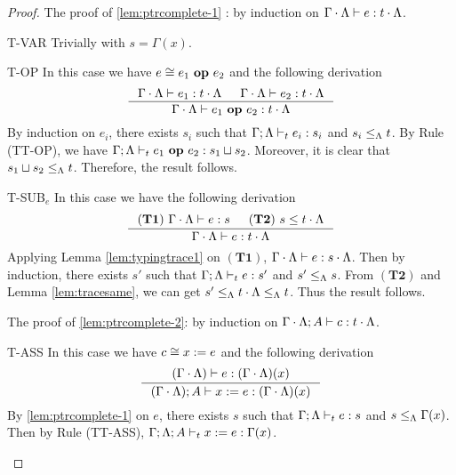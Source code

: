 {{{\begin{proof}
The proof of \ref{lem:ptrcomplete-1} : by induction on $\Gamma\cdot\Lambda \vdash e : t\cdot \Lambda $.
\begin{ProofEnumDesc}
\item[T-VAR] Trivially with $s = \Gamma(x)$.


\item[T-OP]  In this case we have $e \cong {e_1}~\textbf{op}~{e_2}$ and the following derivation
\begin{equation*}
\inference
{\Gamma\cdot\trace\vdash e_1 : t\cdot\trace & \Gamma\cdot\trace \vdash e_2 : t\cdot\trace}
{\Gamma\cdot\trace\vdash \leOP{e_1}{e_2} : t\cdot\trace}
\end{equation*}
By induction on $e_i$, there exists $s_i$ such that $\Gamma; \Lambda \vdash_{t} e_i : s_i$ and $s_i \leq_{\Lambda} t$.
By Rule {(TT-OP)}, we have $\Gamma; \Lambda\vdash_{t} {e_1}~\textbf{op}~{e_2} : s_1 \sqcup s_2$.
Moreover, it is clear that $s_1 \sqcup s_2 \leq_{\Lambda} t$. Therefore, the result follows.

\item[T-SUB$_e$] In this case we have the following derivation
\begin{equation*}
\inference
{(\mathbf{T1})~\Gamma\cdot\trace \vdash e : s & (\mathbf{T2})~s \leq t\cdot\trace}
{\Gamma\cdot\trace \vdash e : t\cdot\trace}
\end{equation*}
Applying Lemma \ref{lem:typingtrace1} on $(\mathbf{T1})$, $\Gamma\cdot\Lambda \vdash e : s\cdot \Lambda$.
Then by induction, there exists $s'$ such that $\Gamma;\Lambda \vdash_{t} e : s'$ and $s' \leq_{\Lambda} s$.
From $(\mathbf{T2})$ and Lemma \ref{lem:tracesame}, we can get $s'\leq_{\Lambda} t\cdot\Lambda \leq_{\Lambda} t $. Thus the result follows.
\end{ProofEnumDesc}
The proof of \ref{lem:ptrcomplete-2}: by induction on $\Gamma\cdot\Lambda; A \vdash c : t\cdot \Lambda $. %
\begin{ProofEnumDesc}
\item[T-ASS] In this case we have $c \cong {x}:={e}$ and the following derivation
\begin{equation*}
\inference
{(\Gamma\cdot\trace) \vdash e : (\Gamma\cdot\trace)(x)}
{(\Gamma\cdot\trace);A \vdash \lcASS{x}{e} : (\Gamma\cdot\trace)(x)}
\end{equation*}
By \ref{lem:ptrcomplete-1} on $e$,  there exists $s$ such that
$\Gamma; \Lambda \vdash_{t} e : s$ and $s \leq_{\Lambda} \Gamma(x)$.
Then by Rule {(TT-ASS)},  $\Gamma;\Lambda; A \vdash_{t} {x}:={e} :\Gamma(x)$.


\end{ProofEnumDesc}
\end{proof}}}}
